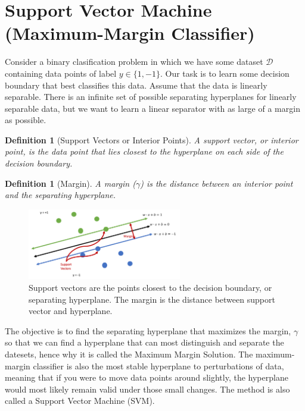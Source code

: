 \documentclass[11pt]{article}
\def\DD{\mathcal{D}}
\newtheorem{definition}[theorem]{Definition}
\begin{document}

\section{Support Vector Machine (Maximum-Margin Classifier)}
Consider a binary clasification problem in which we have some dataset $\DD$ containing data points of label $y \in \{1, -1\}$. Our task is to learn some decision boundary that best classifies this data. Assume that the data is linearly separable. There is an infinite set of possible separating hyperplanes for linearly separable data, but we want to learn a linear separator with as large of a margin as possible.

\begin{definition}[Support Vectors or Interior Points]
A support vector, or interior point, is the data point that lies closest to the hyperplane on each side of the decision boundary.
\end{definition}

\begin{definition}[Margin]
A margin ($\gamma$) is the distance between an interior point and the separating hyperplane. 
\end{definition}

\begin{figure}[H]
    \centering
    \includegraphics[width=0.6\textwidth]{images/margin_def.png}
    \caption{Support vectors are the points closest to the decision boundary, or separating hyperplane. The margin is the distance between support vector and hyperplane.}
    \label{fig:support_vectors}
\end{figure}

The objective is to find the separating hyperplane that maximizes the margin, $\gamma$ so that we can find a hyperplane that can most distinguish and separate the datesets, hence why it is called the Maximum Margin Solution. The maximum-margin classifier is also the most stable hyperplane to perturbations of data, meaning that if you were to move data points around slightly, the hyperplane would most likely remain valid under those small changes. The method is also called a Support Vector Machine (SVM).
\end{document}
